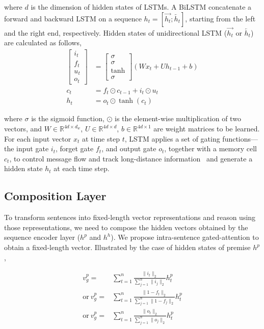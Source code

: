 \documentclass[11pt,letterpaper]{article}
\newcommand{\RR}{\mathbb{R}}
\begin{document}
\noindent where $d$ is the dimension of hidden states of LSTMs.
A BiLSTM concatenate a forward and backward LSTM on a sequence $h_t=[\overrightarrow{h_t};\overleftarrow{h_t}]$, starting from the left and the right end, respectively. Hidden states of unidirectional LSTM ($\overrightarrow{h_t}$ or $\overleftarrow{h_t}$) are calculated as follows, 
\begin{align}
 \begin{bmatrix}
  i_t \\
  f_t \\
  u_t \\
  o_t
 \end{bmatrix}
&= 
 \begin{bmatrix}
  \sigma \\
  \sigma \\
  \tanh \\
  \sigma
  \end{bmatrix} 
 (W x_t + Uh_{t-1} + b) \\
c_t &= f_t \odot c_{t-1} + i_t \odot u_t \\
h_t &= o_t \odot \tanh(c_t)
\end{align}

\noindent  where $\sigma$ is the sigmoid function, $\odot$ is the element-wise multiplication of two vectors, and ${W} \in \RR^{4d \times d_w}$, ${U} \in \RR^{4d \times d}$, $b \in \RR^{4d \times 1}$ are weight matrices to be learned. For each input vector $x_t$ at time step $t$, LSTM applies a set of gating functions---the input gate $i_t$, forget gate $f_t$, and output gate $o_t$, together with a memory cell $c_t$, to control message flow and track long-distance information~\citep{DBLP:journals/neco/HochreiterS97} and generate a hidden state ${h}_t$ at each time step. 

\subsection{Composition Layer}
To transform sentences into fixed-length vector representations and reason using those representations, we need to compose the hidden vectors obtained by the sequence encoder layer ($h^p$ and $h^h$). We propose intra-sentence gated-attention to obtain a fixed-length vector. Illustrated by the case of hidden states of premise $h^p$,

\begin{align}
\label{equ:gate}
v^p_g =& \sum_{t=1}^n \frac{\lVert i_t \rVert_2}{\sum_{j=1}^n{\lVert i_j \rVert_2}} h^p_t \\ 
\text{or}~v^p_g =& \sum_{t=1}^n \frac{\lVert 1-f_t \rVert_2}{\sum_{j=1}^n{\lVert 1-f_j \rVert_2}} h^p_t \\
\text{or}~v^p_g =& \sum_{t=1}^n \frac{\lVert o_t\rVert_2}{\sum_{j=1}^n{\lVert o_j \rVert_2}} h^p_t 
\end{align}
\end{document}

